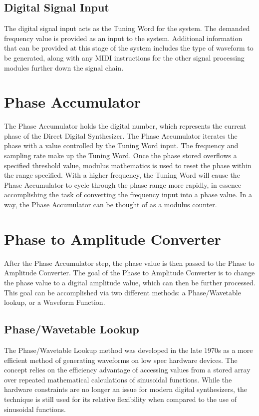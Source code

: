 \documentclass[a4paper,12pt]{report}
\begin{document}
\subsection{Digital Signal Input}
\label{subsec:digitalsignalinput}
The digital signal input acts as the Tuning Word for the system. The demanded frequency value is provided as an input to the system. Additional information that can be provided at this stage of the system includes the type of waveform to be generated, along with any MIDI instructions for the other signal processing modules further down the signal chain.

\section{Phase Accumulator}
\label{sec:phaseaccu}
The Phase Accumulator holds the digital number, which represents the current phase of the Direct Digital Synthesizer. The Phase Accumulator iterates the phase with a value controlled by the Tuning Word input. The frequency and sampling rate make up the Tuning Word. Once the phase stored overflows a specified threshold value, modulus mathematics is used to reset the phase within the range specified. With a higher frequency, the Tuning Word will cause the Phase Accumulator to cycle through the phase range more rapidly, in essence accomplishing the task of converting the frequency input into a phase value. In a way, the Phase Accumulator can be thought of as a modulus counter.

\section{Phase to Amplitude Converter}
\label{sec:phasetoamplitudeconverter}
After the Phase Accumulator step, the phase value is then passed to the Phase to Amplitude Converter. The goal of the Phase to Amplitude Converter is to change the phase value to a digital amplitude value, which can then be further processed. This goal can be accomplished via two different methods: a Phase/Wavetable lookup, or a Waveform Function.

\subsection{Phase/Wavetable Lookup}
\label{subsec:phasewavetablelookup}
The Phase/Wavetable Lookup method was developed in the late 1970s as a more efficient method of generating waveforms on low spec hardware devices. The concept relies on the efficiency advantage of accessing values from a stored array over repeated mathematical calculations of sinusoidal functions. While the hardware constraints are no longer an issue for modern digital synthesizers, the technique is still used for its relative flexibility when compared to the use of sinusoidal functions.
\end{document}

